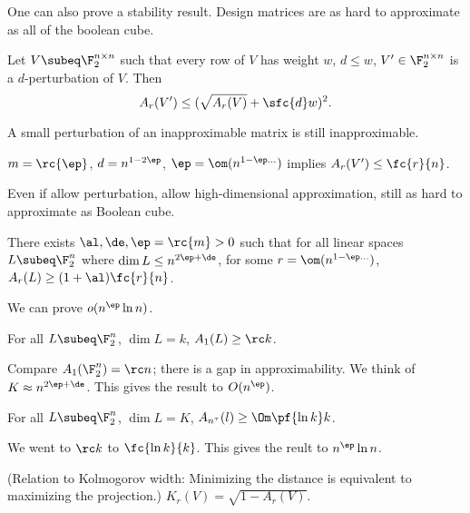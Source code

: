 One can also prove a stability result. Design matrices are as hard to approximate as all of the boolean cube.
\begin{lem}
Let $V\subeq \F_2^{n\times n}$  such that every row of $V$ has weight $w$, $d\le w$, $V'\in \F_2^{n\times n}$ is a $d$-perturbation of $V$. Then
\[
A_r(V')\le (\sqrt{A_r(V)}+\sfc{d}w)^2.
\]
\end{lem}
A small perturbation of an inapproximable matrix is still inapproximable.
\begin{lem}
$m=\rc{\ep}$, $d=n^{1-2\ep}$, $\ep=\om(n^{1-\ep...})$ implies $A_r(V')\le \fc{r}{n}$.
\end{lem}
Even if allow perturbation, allow high-dimensional approximation, still as hard to approximate as Boolean cube. %
\begin{conj}
There exists $\al,\de,\ep=\rc{m}>0$ such that 
for all linear spaces $L\subeq \F_2^n$ where $\dim L\le n^{2\ep+\de}$, for some $r=\om(n^{1-\ep...})$, $A_r(L)\ge (1+\al) \fc{r}{n}$.
\end{conj}

We can prove $o(n^{\ep}\ln n)$.

\begin{thm}
For all $L\subeq \F_2^n$, $\dim L=k$, $A_1(L)\ge \rc k$.
\end{thm}
Compare $A_1(\F_2^n)=\rc n$; there is a gap in approximability. We think of $K\approx n^{2\ep+\de}$. %
This gives the result to $O(n^\ep)$.
\begin{thm}
For all $L\subeq \F_2^n$, $\dim L=K$, $A_{n^{\tau}}(l)\ge \Om\pf{\ln k}k$.
\end{thm}
We went to $\rc k$ to $\fc{\ln k}{k}$. This gives the reult to $n^\ep\ln n$.

(Relation to Kolmogorov width: Minimizing the distance is equivalent to maximizing the projection.)
$K_r(V)=\sqrt{1-A_r(V)}$.

